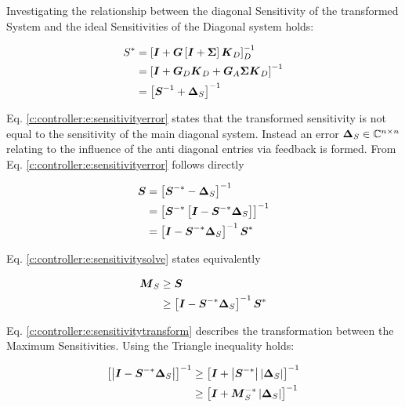 Investigating the relationship between the diagonal Sensitivity of the transformed System and the ideal Sensitivities of the Diagonal system holds:

\begin{align}
\begin{split}
S^* &= \left[\mbox{\boldmath$I$}+\mbox{\boldmath$G$} \left[ \mbox{\boldmath$I$} + \mbox{\boldmath$\Sigma$} \right] \mbox{\boldmath$K$}_D \right]_D^{-1} \\
&= \left[\mbox{\boldmath$I$}+\mbox{\boldmath$G$}_D \mbox{\boldmath$K$}_D + \mbox{\boldmath$G$}_A \mbox{\boldmath$\Sigma$} \mbox{\boldmath$K$}_D  \right]^{-1} \\
&= \left[ \mbox{\boldmath$S$}^{-1} + \mbox{\boldmath$\Delta$}_{S}\right]^{-1}
\end{split}
\label{c:controller:e:sensitivityerror}
\end{align}

Eq. \ref{c:controller:e:sensitivityerror} states that the transformed sensitivity is not equal to the sensitivity of the main diagonal system. Instead an error $\mbox{\boldmath$\Delta$}_{S} \in \mathbb{C}^{n \times n}$ relating to the influence of the anti diagonal entries via feedback is formed. From Eq. \ref{c:controller:e:sensitivityerror} follows directly

\begin{align}
\begin{split}
\mbox{\boldmath$S$} &= \left[ \mbox{\boldmath$S$}^{-*}- \mbox{\boldmath$\Delta$}_{S}\right]^{-1} \\
&= \left[ \mbox{\boldmath$S$}^{-*}\left[ \mbox{\boldmath$I$} - \mbox{\boldmath$S$}^{-*}\mbox{\boldmath$\Delta$}_S\right] \right]^{-1} \\
&= \left[ \mbox{\boldmath$I$} - \mbox{\boldmath$S$}^{-*}\mbox{\boldmath$\Delta$}_S\right]^{-1} \mbox{\boldmath$S$}^{*}
\end{split}
\label{c:controller:e:sensitivitysolve}
\end{align}

Eq. \ref{c:controller:e:sensitivitysolve} states equivalently

\begin{align}
\begin{split}
\mbox{\boldmath$M$}_S &\geq \mbox{\boldmath$S$} \\
&\geq \left[ \mbox{\boldmath$I$} - \mbox{\boldmath$S$}^{-*}\mbox{\boldmath$\Delta$}_S\right]^{-1} \mbox{\boldmath$S$}^{*}
\end{split}
\label{c:controller:e:sensitivitytransform}
\end{align}

Eq. \ref{c:controller:e:sensitivitytransform} describes the transformation between the Maximum Sensitivities. 
Using the Triangle inequality holds:

\begin{align}
\begin{split}
\left[\left| \mbox{\boldmath$I$} - \mbox{\boldmath$S$}^{-*} \mbox{\boldmath$\Delta$}_S  \right| \right]^{-1} &\geq \left[\mbox{\boldmath$I$} + \left|\mbox{\boldmath$S$}^{-*} \right| \left| \mbox{\boldmath$\Delta$}_S  \right| \right]^{-1} \\
&\geq \left[\mbox{\boldmath$I$} + \mbox{\boldmath$M$}_S^{-*} \left| \mbox{\boldmath$\Delta$}_S  \right| \right]^{-1} 
\end{split}
\end{align}

